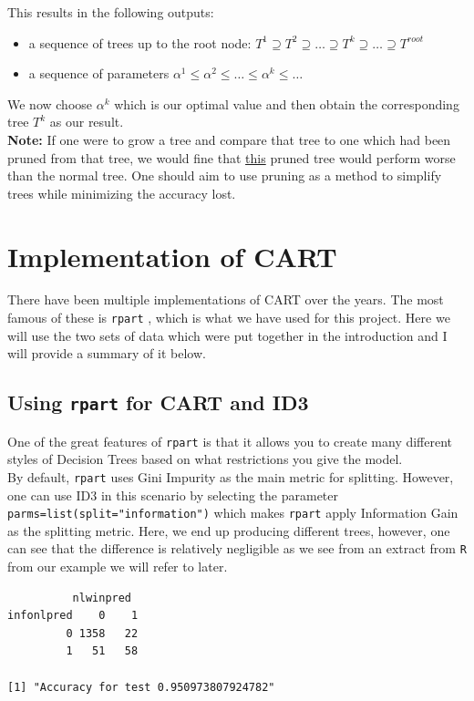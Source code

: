 \documentclass[11pt,a4paper]{report}
\begin{document}
This results in the following outputs:
\begin{itemize}
    \item a sequence of trees up to the root node: $T^1 \supseteq T^2 \supseteq \dots \supseteq T^k \supseteq \dots \supseteq T^{root}$
    
    \item a sequence of parameters $\alpha^1 \leq \alpha^2 \leq \dots \leq \alpha^k \leq \dots$
\end{itemize}
We now choose $\alpha^k$ which is our optimal value and then obtain the corresponding tree $T^k$ as our result.
\bigskip\\
\textbf{Note:} If one were to grow a tree and compare that tree to one which had been pruned from that tree, we would fine that \underline{this} pruned tree would perform worse than the normal tree.
One should aim to use pruning as a method to simplify trees while minimizing the accuracy lost.





\section{Implementation of CART}
There have been multiple implementations of CART over the years. The most famous of these is {\color{blue} \texttt{rpart}} \cite{rpart}, which is what we have used for this project. 
Here we will use the two sets of data which were put together in the introduction and I will provide a summary of it below.

\subsection{Using {\color{blue} \texttt{rpart}} for CART and ID3}
One of the great features of {\color{blue} \texttt{rpart}} is that it allows you to create many different styles of Decision Trees based on what restrictions you give the model.
\medskip\\
By default, {\color{blue} \texttt{rpart}} uses Gini Impurity as the main metric for splitting. 
However, one can use ID3 in this scenario by selecting the parameter \texttt{parms=list(split="information")} which makes {\color{blue} \texttt{rpart}} apply Information Gain as the splitting metric.
Here, we end up producing different trees, however, one can see that the difference is relatively negligible as we see from an extract from {\color{blue} \texttt{R}} from our example we will refer to later.
\begin{verbatim}
          nlwinpred
infonlpred    0    1
         0 1358   22
         1   51   58

[1] "Accuracy for test 0.950973807924782"
\end{verbatim}
\end{document}
